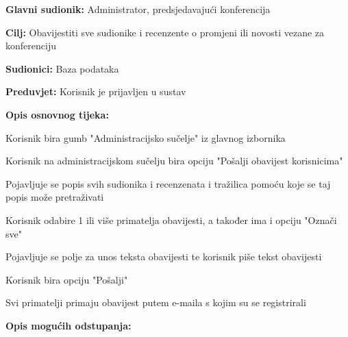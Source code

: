 \begin{packed_item}
					\end{packed_item}

					\noindent {}
					\begin{packed_item}
						\item \textbf{Glavni sudionik:} Administrator, predsjedavajući konferencija
						\item \textbf{Cilj:} Obavijestiti sve sudionike i recenzente o promjeni ili novosti vezane za konferenciju
						\item \textbf{Sudionici:} Baza podataka
						\item \textbf{Preduvjet:} Korisnik je prijavljen u sustav
						
						\item \textbf{Opis osnovnog tijeka:} 
						\item[] \begin{packed_enum}
							\item Korisnik bira gumb "Administracijsko sučelje" iz glavnog izbornika
							\item Korisnik na administracijskom sučelju bira opciju "Pošalji obavijest korisnicima"
							\item Pojavljuje se popis svih sudionika i recenzenata i tražilica pomoću koje se taj popis može pretraživati
							\item Korisnik odabire 1 ili više primatelja obavijesti, a također ima i opciju "Označi sve"
							\item Pojavljuje se polje za unos teksta obavijesti te korisnik piše tekst obavijesti
							\item Korisnik bira opciju "Pošalji"
							\item Svi primatelji primaju obavijest putem e-maila s kojim su se registrirali
						\end{packed_enum}
					
						\item \textbf{Opis mogućih odstupanja:}
						\item[] \begin{packed_enum}
							
		


\end{packed_enum}
\end{packed_item}
